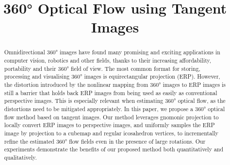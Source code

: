\documentclass{bmvc2k}
\title{360\!° Optical Flow using Tangent Images}
\begin{document}
\maketitle

\begin{abstract}
\noindent
Omnidirectional 360° images have found many promising and exciting applications in computer vision, robotics and other fields, thanks to their increasing affordability, portability and their 360° field of view.
%
The most common format for storing, processing and visualising 360° images is equirectangular projection (ERP).
%
However, the distortion introduced by the nonlinear mapping from 360° images to ERP images is still a barrier that holds back ERP images from being used as easily as conventional perspective images.
This is especially relevant when estimating 360° optical flow, as the distortions need to be mitigated appropriately.
In this paper, we propose a 360° optical flow method based on tangent images.
Our method leverages gnomonic projection to locally convert ERP images to perspective images, and uniformly samples the ERP image by projection to a cubemap and regular icosahedron vertices, to incrementally refine the estimated 360° flow fields even in the presence of large rotations.
%
Our experiments demonstrate the benefits of our proposed method both quantitatively and qualitatively.
%
\end{abstract}













\end{document}
